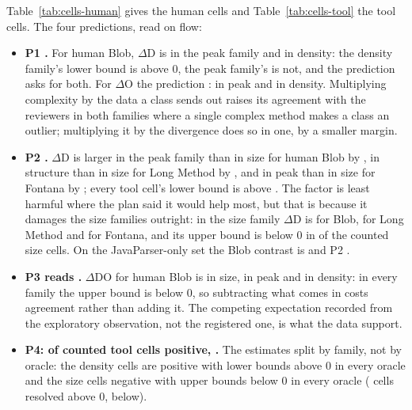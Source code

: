 \documentclass[11pt,a4paper]{article}
\newcommand{\fitwidth}[1]{\resizebox{\ifdim\width>\textwidth\textwidth\else\width\fi}{!}{#1}}
\newcommand{\dD}{$\Delta$D}
\newcommand{\dO}{$\Delta$O}
\newcommand{\dDO}{$\Delta$DO}
\begin{document}
\begin{table}[t]
\centering
\caption{The same cells for the tool oracles on the seed-3 sample and for
the internal definitions. Ingredient cells and PMD GodClass cells are
reported and not counted toward the construct.}
\label{tab:cells-tool}
\small
\setlength{\tabcolsep}{4pt}
\fitwidth{}
\end{table}

Table~\ref{tab:cells-human} gives the human cells and
Table~\ref{tab:cells-tool} the tool cells. The four predictions, read on
flow:

\begin{itemize}
\item \textbf{P1 \pOneHolds.} For human Blob, \dD{} is \pOneDPeak{} in the peak family and \pOneDDensity{} in density: the density family's
  lower bound is above 0, the peak family's is not, and the prediction asks
  for both. For \dO{} the prediction \pOneOHolds: \pOneOPeak{} in peak and
  \pOneODensity{} in density. Multiplying complexity by the data a class
  sends out raises its agreement with the reviewers in both families where a
  single complex method makes a class an outlier; multiplying it by the
  divergence does so in one, by a smaller margin.
\item \textbf{P2 \pTwoHolds.} \dD{} is larger in the peak family than in
  size for human Blob by \pTwoBlob{}, in structure than in size for Long
  Method by \pTwoLong{}, and in peak than in size for Fontana by
  \pTwoFontana{}; every tool cell's lower bound is above
  \pTwoMinToolLo{}. The factor is least harmful where the plan said it
  would help most, but that is because it damages the size families
  outright: in the size family \dD{} is \cellBlobSizeD{} for Blob,
  \cellLongSizeD{} for Long Method and \cellFontanaSizeD{} for Fontana,
  and its upper bound is below 0 in \cellsSizeDHiBelow{} of the
  \cellsSizeFlow{} counted size cells. On the JavaParser-only set the Blob
  contrast is \pTwoJpBlob{} and P2 \pTwoJpHolds{}.
\item \textbf{P3 reads \pThreeReads.} \dDO{} for human Blob is
  \pThreeSize{} in size, \pThreePeak{} in peak and \pThreeDensity{} in
  density: in every family the upper bound is below 0, so subtracting what
  comes in costs agreement rather than adding it. The competing expectation
  recorded from the exploratory observation, not the registered one, is
  what the data support.
\item \textbf{P4: \pFourPositive{} of \pFourCells{} counted tool cells
  positive, \pFourMajority.} The estimates split by family, not by oracle:
  the density cells are positive with lower bounds above 0 in every oracle
  and the size cells negative with upper bounds below 0 in every oracle
  (\pFourLoAbove{} cells resolved above 0, \pFourHiBelow{} below).
\end{itemize}
\end{document}
